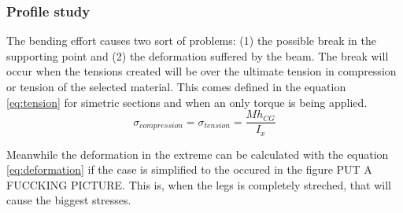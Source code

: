 \subsubsection{Profile study} %
\label{ssub:profile_study}
  The bending effort causes two sort of problems: (1) the possible break in the supporting point and (2) the deformation suffered by the beam.
  The break will occur when the tensions created will be over the ultimate tension in compression or tension of the selected material.
  This comes defined in the equation \ref{eq:tension} for simetric sections and when an only torque is being applied.
  \begin{equation}
  \label{eq:tension}
    \sigma _{compression} = \sigma _{tension} = \frac{M h_{CG}}{I_x}
  \end{equation}

  Meanwhile the deformation in the extreme can be calculated with the equation \ref{eq:deformation} if the case is simplified to the occured in the figure PUT A FUCCKING PICTURE.
  This is, when the legs is completely streched, that will cause the biggest stresses.

